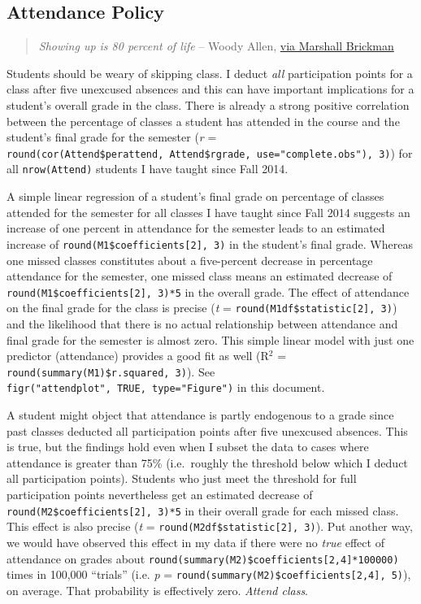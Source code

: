 \documentclass[11pt,]{article}
\begin{document}
\subsection{Attendance Policy}\label{attendance-policy}

\begin{quote}
\emph{Showing up is 80 percent of life} -- Woody Allen,
\href{http://quoteinvestigator.com/2013/06/10/showing-up/\#note-6553-1}{via
Marshall Brickman}
\end{quote}

Students should be weary of skipping class. I deduct \emph{all}
participation points for a class after five unexcused absences and this
can have important implications for a student's overall grade in the
class. There is already a strong positive correlation between the
percentage of classes a student has attended in the course and the
student's final grade for the semester (\emph{r} =
\texttt{round(cor(Attend\$perattend,\ Attend\$rgrade,\ use="complete.obs"),\ 3)})
for all \texttt{nrow(Attend)} students I have taught since Fall 2014.

A simple linear regression of a student's final grade on percentage of
classes attended for the semester for all classes I have taught since
Fall 2014 suggests an increase of one percent in attendance for the
semester leads to an estimated increase of
\texttt{round(M1\$coefficients{[}2{]},\ 3)} in the student's final
grade. Whereas one missed classes constitutes about a five-percent
decrease in percentage attendance for the semester, one missed class
means an estimated decrease of
\texttt{round(M1\$coefficients{[}2{]},\ 3)*5} in the overall grade. The
effect of attendance on the final grade for the class is precise
(\emph{t} = \texttt{round(M1df\$statistic{[}2{]},\ 3)}) and the
likelihood that there is no actual relationship between attendance and
final grade for the semester is almost zero. This simple linear model
with just one predictor (attendance) provides a good fit as well
(R\(^2\) = \texttt{round(summary(M1)\$r.squared,\ 3)}). See
\texttt{figr("attendplot",\ TRUE,\ type="Figure")} in this document.

A student might object that attendance is partly endogenous to a grade
since past classes deducted all participation points after five
unexcused absences. This is true, but the findings hold even when I
subset the data to cases where attendance is greater than 75\%
(i.e.~roughly the threshold below which I deduct all participation
points). Students who just meet the threshold for full participation
points nevertheless get an estimated decrease of
\texttt{round(M2\$coefficients{[}2{]},\ 3)*5} in their overall grade for
each missed class. This effect is also precise (\emph{t} =
\texttt{round(M2df\$statistic{[}2{]},\ 3)}). Put another way, we would
have observed this effect in my data if there were no \emph{true} effect
of attendance on grades about
\texttt{round(summary(M2)\$coefficients{[}2,4{]}*100000)} times in
100,000 ``trials'' (i.e. \emph{p} =
\texttt{round(summary(M2)\$coefficients{[}2,4{]},\ 5)}), on average.
That probability is effectively zero. \emph{Attend class}.
\end{document}
